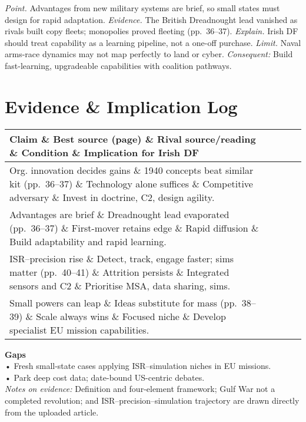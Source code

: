 \textit{Point.} Advantages from new military systems are brief, so small states must design for rapid adaptation.  
\textit{Evidence.} The British Dreadnought lead vanished as rivals built copy fleets; monopolies proved fleeting (pp.~36--37).  
\textit{Explain.} Irish DF should treat capability as a learning pipeline, not a one-off purchase.  
\textit{Limit.} Naval arms-race dynamics may not map perfectly to land or cyber.  
\textit{Consequent:} Build fast-learning, upgradeable capabilities with coalition pathways.  


\section*{Evidence \& Implication Log}  
\begin{tabular}{p{3.2cm}p{4.2cm}p{3.6cm}p{3.2cm}p{4.2cm}}  
	\textbf{Claim} \& \textbf{Best source (page)} \& \textbf{Rival source/reading} \& \textbf{Condition} \& \textbf{Implication for Irish DF}\\\hline  
	Org. innovation decides gains \& 1940 concepts beat similar kit (pp.~36--37) \& Technology alone suffices \& Competitive adversary \& Invest in doctrine, C2, design agility.\\  
	Advantages are brief \& Dreadnought lead evaporated (pp.~36--37) \& First-mover retains edge \& Rapid diffusion \& Build adaptability and rapid learning.\\  
	ISR--precision rise \& Detect, track, engage faster; sims matter (pp.~40--41) \& Attrition persists \& Integrated sensors and C2 \& Prioritise MSA, data sharing, sims.\\  
	Small powers can leap \& Ideas substitute for mass (pp.~38--39) \& Scale always wins \& Focused niche \& Develop specialist EU mission capabilities.\\\hline  
\end{tabular}  

\textbf{Gaps}\\  
• Fresh small-state cases applying ISR--simulation niches in EU missions.\\  
• Park deep cost data; date-bound US-centric debates.\\  

\textit{Notes on evidence:} Definition and four-element framework; Gulf War not a completed revolution; and ISR--precision--simulation trajectory are drawn directly from the uploaded article.  

\parencite{KEOHANE_1988}
